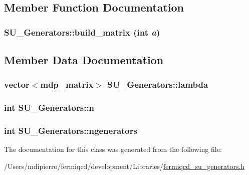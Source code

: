 \subsection{Member Function Documentation}
\hypertarget{class_s_u___generators_aba3244f13bc625fabd171cce694f3e9b}{
\subsubsection[{build\_\-matrix}]{ SU\_\-Generators::build\_\-matrix (int {\em a})}}
\label{class_s_u___generators_aba3244f13bc625fabd171cce694f3e9b}


\subsection{Member Data Documentation}
\hypertarget{class_s_u___generators_a15ed0103ec40c52a54b3900516ed713f}{
\subsubsection[{lambda}]{\setlength{\rightskip}{0pt plus 5cm}vector$<${\bf mdp\_\-matrix}$>$ {\bf SU\_\-Generators::lambda}}}
\label{class_s_u___generators_a15ed0103ec40c52a54b3900516ed713f}
\hypertarget{class_s_u___generators_a02ad86d7679e2e64a7177d6caecb12fd}{
\subsubsection[{n}]{\setlength{\rightskip}{0pt plus 5cm}int {\bf SU\_\-Generators::n}}}
\label{class_s_u___generators_a02ad86d7679e2e64a7177d6caecb12fd}
\hypertarget{class_s_u___generators_a0ad4b16aa28e9eabeb738634efa1fa23}{
\subsubsection[{ngenerators}]{\setlength{\rightskip}{0pt plus 5cm}int {\bf SU\_\-Generators::ngenerators}}}
\label{class_s_u___generators_a0ad4b16aa28e9eabeb738634efa1fa23}


The documentation for this class was generated from the following file:\begin{DoxyCompactItemize}
\item 
/Users/mdipierro/fermiqcd/development/Libraries/\hyperlink{fermiqcd__su__generators_8h}{fermiqcd\_\-su\_\-generators.h}\end{DoxyCompactItemize}
